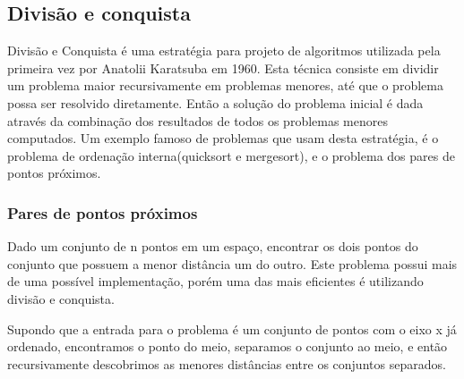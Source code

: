 \subsection{Divisão e conquista}

    Divisão e Conquista é uma estratégia para projeto de algoritmos utilizada 
    pela primeira vez por Anatolii Karatsuba em 1960. Esta técnica consiste em dividir um problema maior 
    recursivamente em problemas menores, até que o problema possa ser resolvido diretamente. Então a 
    solução do problema inicial é dada através da combinação dos resultados de todos os problemas 
    menores computados. Um exemplo famoso de problemas que usam desta estratégia, é o problema de 
    ordenação interna(quicksort e mergesort), e o problema dos pares de pontos próximos.

\subsubsection{Pares de pontos próximos}

    Dado um conjunto de n pontos em um espaço, encontrar os dois pontos do conjunto que possuem a 
    menor distância um do outro. Este problema possui mais de uma possível implementação, porém 
    uma das mais eficientes é utilizando divisão e conquista.

    Supondo que a entrada para o problema é um conjunto de pontos com o eixo x já ordenado,
    encontramos o ponto do meio, separamos o conjunto ao meio, e então recursivamente descobrimos
    as menores distâncias entre os conjuntos separados.